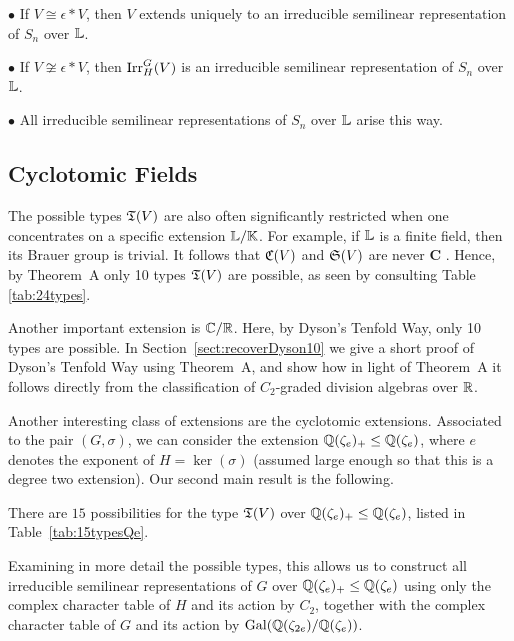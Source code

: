 \vspace{0.2em}

\noindent \hspace{0.7em} $\bullet$ If $V \cong \epsilon * V$, then $V$ extends uniquely to an irreducible semilinear representation of $S_n$ over ${\mathbb L}$.

\noindent \hspace{0.7em} $\bullet$ If $V \not\cong \epsilon * V$, then $\operatorname{Irr}_H^G(V)$ is an irreducible semilinear representation of $S_n$ over ${\mathbb L}$.

\noindent \hspace{0.7em} $\bullet$ All irreducible semilinear representations of $S_n$ over ${\mathbb L}$ arise this way.

\subsection*{Cyclotomic Fields}
The possible types ${\mathfrak T}(V)$ are also often significantly restricted when one concentrates on a specific extension ${\mathbb L} / {\mathbb K}$.
For example, if ${\mathbb L}$ is a finite field, then its Brauer group is trivial.
It follows that ${\mathfrak C}(V)$ and ${\mathfrak S}(V)$ are never \textbf{C} \cite[Cor.\ 9.4]{TAYSchur}.
Hence, by Theorem~A only 10 types ${\mathfrak T}(V)$ are possible, as seen by consulting Table \ref{tab:24types}.

Another important extension is ${\mathbb C} / {\mathbb R}$.
Here, by Dyson's Tenfold Way, only 10 types are possible. In Section~\ref{sect:recoverDyson10} we give a short proof of Dyson's Tenfold Way using Theorem~A, and show how in light of Theorem~A it follows directly from the classification of $C_2$-graded division algebras over ${\mathbb R}$.

Another interesting class of extensions are the cyclotomic extensions.
Associated to the pair $(G, \sigma)$, we can consider the extension ${\mathbb Q}(\zeta_e)_+ \leq {\mathbb Q}(\zeta_e)$, where $e$ denotes the exponent of $H = \ker(\sigma)$ (assumed large enough so that this is a degree two extension). Our second main result is the following.

\begin{theoremB}
There are $15$ possibilities for the type ${\mathfrak T}(V)$ over ${\mathbb Q}(\zeta_e)_+ \leq {\mathbb Q}(\zeta_e)$, listed in Table~\ref{tab:15typesQe}.
\end{theoremB}

Examining in more detail the possible types, this allows us to construct all irreducible semilinear representations of $G$ over ${\mathbb Q}(\zeta_e)_+ \leq {\mathbb Q}(\zeta_e)$ using only the complex character table of $H$ and its action by $C_2$, together with the complex character table of $G$ and its action by $\operatorname{Gal}({\mathbb Q}(\zeta_{2e}) / {\mathbb Q}(\zeta_e))$.

